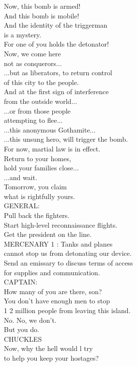 \documentclass{article}
\begin{document}
\begin{multicols}{3}
Now, this bomb is armed!\\
And this bomb is mobile!\\
And the identity of the triggerman\\
is a mystery.\\
For one of you holds the detonator!\\
Now, we come here\\
not as conquerors...\\
...but as liberators, to return control\\
of this city to the people.\\
And at the first sign of interference\\
from the outside world...\\
...or from those people\\
attempting to flee...\\
...this anonymous Gothamite...\\
...this unsung hero, will trigger the bomb.\\
For now, martial law is in effect.\\
Return to your homes,\\
hold your families close...\\
...and wait.\\
Tomorrow, you claim\\
what is rightfully yours.\\
GENERAL:\\
Pull back the fighters.\\
Start high-level reconnaissance flights.\\
Get the president on the line.\\
MERCENARY 1 : Tanks and planes\\
cannot stop us from detonating our device.\\
Send an emissary to discuss terms of access\\
for supplies and communication.\\
CAPTAIN:\\
How many of you are there, son?\\
You don't have enough men to stop\\
 1 2 million people from leaving this island.\\
No. No, we don't.\\
But you do.\\
CHUCKLES\\
Now, why the hell would l try\\
to help you keep your hostages?\\

\end{multicols}
\end{document}
